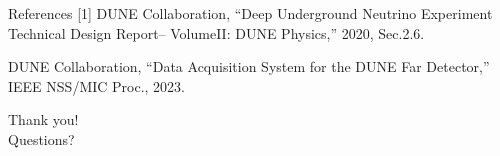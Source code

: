 \documentclass[aspectratio=169]{beamer}
\begin{document}
\begin{frame}[allowframebreaks]{References}
\small
[1] DUNE Collaboration, “Deep Underground Neutrino Experiment Technical Design Report– VolumeII: DUNE Physics,” 2020, Sec.2.6.\par
[2] DUNE Collaboration, “Data Acquisition System for the DUNE Far Detector,” IEEE NSS/MIC Proc., 2023.\\
\end{frame}

\begin{frame}[standout]
Thank you! \\
Questions?
\end{frame}
\end{document}
